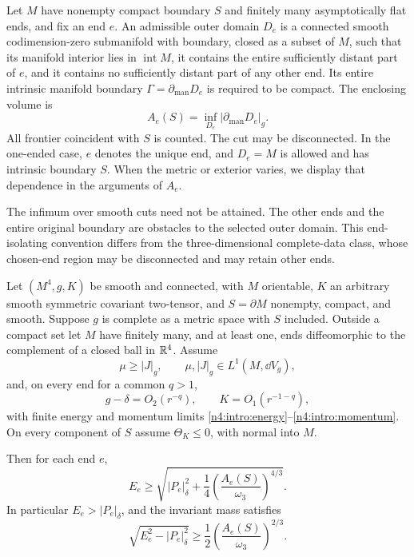 \begin{definition}\label{n4:def:cuts}
Let \(M\) have nonempty compact boundary \(S\) and finitely many
asymptotically flat ends, and fix an end \(e\).
An admissible outer domain \(D_e\) is a connected smooth
codimension-zero submanifold with boundary, closed as a subset of \(M\),
such that its manifold interior lies in \(\operatorname{int}M\),
it contains the entire sufficiently distant part of \(e\), and
it contains no sufficiently distant part of any other end.
Its entire intrinsic manifold boundary
\(\Gamma=\partial_{\mathrm{man}}D_e\) is required to be compact.
The enclosing volume is
\[
 A_e(S)=\inf_{D_e}|\partial_{\mathrm{man}}D_e|_g.
\]
All frontier coincident with \(S\) is counted. The cut may be
disconnected. In the one-ended case, \(e\) denotes the unique end, and
\(D_e=M\) is allowed and has intrinsic boundary \(S\).
When the metric or exterior varies, we display
that dependence in the arguments of \(A_e\).
\end{definition}

The infimum over smooth cuts need not be attained. The other ends and
the entire original boundary are obstacles to the selected outer domain.
This end-isolating convention differs from the three-dimensional
complete-data class, whose chosen-end region may be disconnected and
may retain other ends.

\begin{theorem}\label{n4:thm:weak}
Let \((M^4,g,K)\) be smooth and
connected, with \(M\) orientable, \(K\) an arbitrary smooth symmetric
covariant two-tensor, and \(S=\partial M\) nonempty, compact, and smooth.
Suppose \(g\) is complete as a metric space with \(S\) included.
Outside a compact set let \(M\) have finitely many, and at least one,
ends diffeomorphic to the complement of a closed ball in \(\mathbb R^4\).
Assume
\[
 \mu\ge|J|_g,\qquad \mu,|J|_g\in L^1(M,\dd V_g),
\]
and, on every end for a common \(q>1\),
\[
 g-\delta=O_2(r^{-q}),\qquad K=O_1(r^{-1-q}),
\]
with finite energy and momentum limits
\eqref{n4:intro:energy}--\eqref{n4:intro:momentum}.
On every component of \(S\) assume \(\Theta_K\le0\), with normal into \(M\).

Then for each end \(e\),
\begin{equation}\label{n4:intro:main}
 E_e\ge
 \sqrt{|P_e|_\delta^2+
       \frac14\left(\frac{A_e(S)}{\omega_3}\right)^{4/3}}.
\end{equation}
In particular \(E_e>|P_e|_\delta\), and the invariant mass satisfies
\begin{equation}\label{n4:intro:mass}
 \sqrt{E_e^2-|P_e|_\delta^2}
   \ge\frac12\left(\frac{A_e(S)}{\omega_3}\right)^{2/3}.
\end{equation}
\end{theorem}

